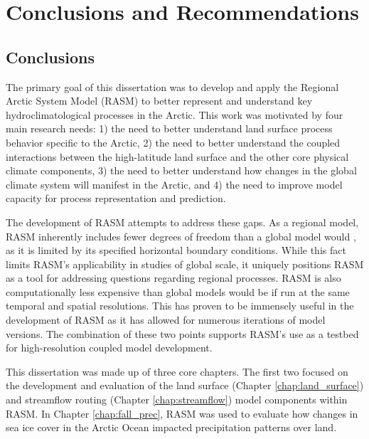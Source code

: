 \chapter{Conclusions and Recommendations}
\label{chap:conclusions}

\section{Conclusions}
The primary goal of this dissertation was to develop and apply the Regional Arctic System Model (RASM) to better represent and understand key hydroclimatological processes in the Arctic.
This work was motivated by four main research needs: 1) the need to better understand land surface process behavior specific to the Arctic, 2) the need to better understand the coupled interactions between the high-latitude land surface and the other core physical climate components, 3) the need to better understand how changes in the global climate system will manifest in the Arctic, and 4) the need to improve model capacity for process representation and prediction.

The development of RASM attempts to address these gaps.
As a regional model, RASM inherently includes fewer degrees of freedom than a global model would \citep[e.g. ][]{Deser_2016}, as it is limited by its specified horizontal boundary conditions.
While this fact limits RASM's applicability in studies of global scale, it uniquely positions RASM as a tool for addressing questions regarding regional processes.
RASM is also computationally less expensive than global models would be if run at the same temporal and spatial resolutions.
This has proven to be immensely useful in the development of RASM as it has allowed for numerous iterations of model versions.
The combination of these two points supports RASM's use as a testbed for high-resolution coupled model development.

This dissertation was made up of three core chapters.
The first two focused on the development and evaluation of the land surface (Chapter \ref{chap:land_surface}) and streamflow routing (Chapter \ref{chap:streamflow}) model components within RASM.
In Chapter \ref{chap:fall_prec}, RASM was used to evaluate how changes in sea ice cover in the Arctic Ocean impacted precipitation patterns over land.

